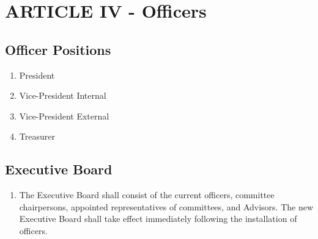\section{ARTICLE IV - Officers}
  \subsection{ Officer Positions}
    \begin{enumerate}[label=\arabic*.]
      \item President
      \item Vice-President Internal
      \item Vice-President External
      \item Treasurer
    \end{enumerate}
  \subsection{Executive Board}
    \begin{enumerate}[label=\arabic*.]
      \item The Executive Board shall consist of the current officers, committee
      chairpersons, appointed representatives of committees, and Advisors. The
      new Executive Board shall take effect immediately following the
      installation of officers.
    \end{enumerate}
